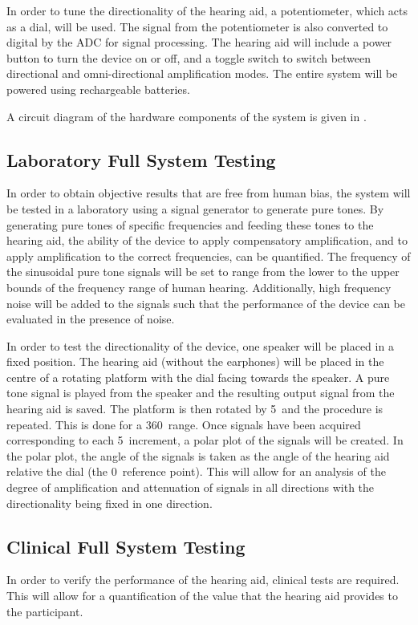 \documentclass[10pt,twocolumn]{witseiepaper}
\begin{document}
In order to tune the directionality of the hearing aid, a potentiometer, which acts as a dial, will be used. The signal from the potentiometer is also converted to digital by the ADC for signal processing. The hearing aid will include a power button to turn the device on or off, and a toggle switch to switch between directional and omni-directional amplification modes. The entire system will be powered using rechargeable batteries. 

A circuit diagram of the hardware components of the system is given in .

\subsection{Laboratory Full System Testing} \label{sec:laboratory}
In order to obtain objective results that are free from human bias, the system will be tested in a laboratory using a signal generator to generate pure tones. By generating pure tones of specific frequencies and feeding these tones to the hearing aid, the ability of the device to apply compensatory amplification, and to apply amplification to the correct frequencies, can be quantified. The frequency of the sinusoidal pure tone signals will be set to range from the lower to the upper bounds of the frequency range of human hearing. Additionally, high frequency noise will be added to the signals such that the performance of the device can be evaluated in the presence of noise.

In order to test the directionality of the device, one speaker will be placed in a fixed position. The hearing aid (without the earphones) will be placed in the centre of a rotating platform with the dial facing towards the speaker. A pure tone signal is played from the speaker and the resulting output signal from the hearing aid is saved. The platform is then rotated by 5\textdegree\ and the procedure is repeated. This is done for a 360\textdegree\ range. Once signals have been acquired corresponding to each 5\textdegree\ increment, a polar plot of the signals will be created. In the polar plot, the angle of the signals is taken as the angle of the hearing aid relative the dial (the 0\textdegree\ reference point). This will allow for an analysis of the degree of amplification and attenuation of signals in all directions with the directionality being fixed in one direction.

\subsection{Clinical Full System Testing} \label{sec:clinical}
In order to verify the performance of the hearing aid, clinical tests are required. This will allow for a quantification of the value that the hearing aid provides to the participant.
\end{document}
